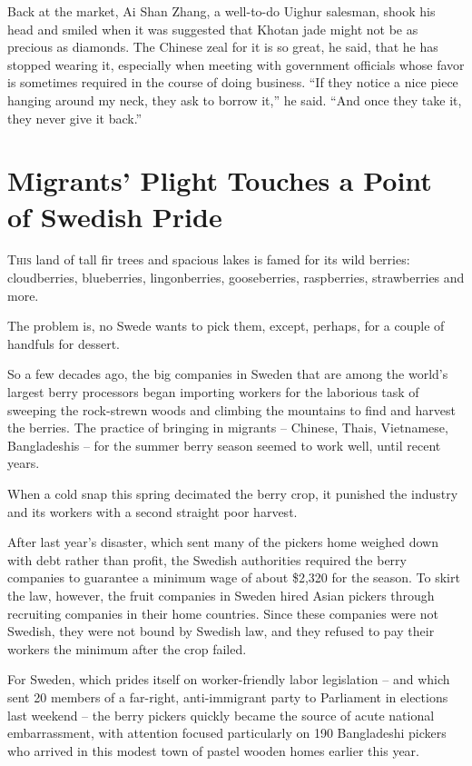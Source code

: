 ﻿\documentclass[12pt]{article}
\begin{document}
Back at the market, Ai Shan Zhang, a well-to-do Uighur salesman, shook his head and smiled when it
was suggested that Khotan jade might not be as precious as diamonds. The Chinese zeal for it is so
great, he said, that he has stopped wearing it, especially when meeting with government officials
whose favor is sometimes required in the course of doing business. ``If they notice a nice piece
hanging around my neck, they ask to borrow it,'' he said. ``And once they take it, they never give
it back.''

\pagebreak
\section{Migrants' Plight Touches a Point of Swedish Pride}

\lettrine{T}{his} land of tall fir trees and spacious lakes is famed for
its wild berries: cloudberries, blueberries, lingonberries, gooseberries, raspberries, strawberries
and more.

The problem is, no Swede wants to pick them, except, perhaps, for a couple of handfuls for dessert.

So a few decades ago, the big companies in Sweden that are among the world's largest berry
processors began importing workers for the laborious task of sweeping the rock-strewn woods and
climbing the mountains to find and harvest the berries. The practice of bringing in migrants --
Chinese, Thais, Vietnamese, Bangladeshis -- for the summer berry season seemed to work well, until
recent years.

When a cold snap this spring decimated the berry crop, it punished the industry and its workers with
a second straight poor harvest.

After last year's disaster, which sent many of the pickers home weighed down with debt rather than
profit, the Swedish authorities required the berry companies to guarantee a minimum wage of about
\$2,320 for the season. To skirt the law, however, the fruit companies in Sweden hired Asian pickers
through recruiting companies in their home countries. Since these companies were not Swedish, they
were not bound by Swedish law, and they refused to pay their workers the minimum after the crop
failed.

For Sweden, which prides itself on worker-friendly labor legislation -- and which sent 20 members of
a far-right, anti-immigrant party to Parliament in elections last weekend -- the berry pickers
quickly became the source of acute national embarrassment, with attention focused particularly on
190 Bangladeshi pickers who arrived in this modest town of pastel wooden homes earlier this year.
\end{document}
